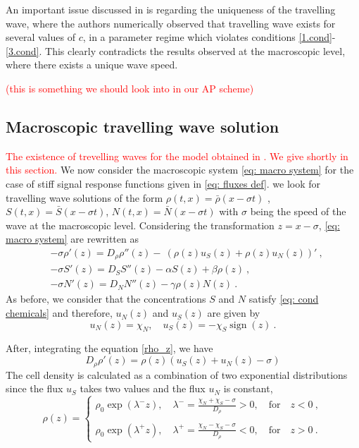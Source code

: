 \documentclass[11pt,twoside]{article}
\DeclareMathOperator{\sign}{sign}
\begin{document}
\noindent An important issue discussed in \cite{calvez2018well} is regarding the uniqueness of the travelling wave, where the authors numerically observed that travelling wave exists for several values of $c$, in a parameter regime which violates conditions \eqref{1.cond}-\eqref{3.cond}. This clearly contradicts the results observed at the macroscopic level, where there exists a unique wave speed.  

\textcolor{red}{(this is something we should look into in our AP scheme)}


\subsection{Macroscopic travelling wave solution}
\textcolor{red}{The existence of trevelling waves for the model obtained in \cite{saragosti2010mathematical}. We give shortly in this section.} We now consider the macroscopic system \eqref{eq: macro system} for the case of stiff signal response functions given in \eqref{eq: fluxes def}. we look for travelling wave solutions of the form
$\rho(t,x)=\bar{\rho}(x-\sigma t)$ , $S(t,x)=\bar{S}(x-\sigma t)$, $N(t,x)=\bar{N}(x-\sigma t)$ with $\sigma$  being the speed of the wave at the macroscopic level. Considering the transformation $z=x-\sigma$,  \eqref{eq: macro system} are rewritten as
\begin{align}
&-\sigma \rho'(z) =D_\rho \rho''(z)-\ (\rho(z) u_S(z)+\rho(z) u_N(z))'\ \label{rho_z},\\
&-\sigma S'(z) =D_S S''(z)-\alpha S(z)+\beta \rho(z)\ ,\\
&-\sigma  N'(z)=D_N N''(z)-\gamma \rho(z) N(z)\ .
\end{align}
As before, we consider that the concentrations $S$ and $N$ satisfy \eqref{eq: cond chemicals} and therefore, $u_N(z)$ and $u_S(z)$ are given by
$$ 
u_N(z)=\chi_N ,\quad u_S(z)=-\chi_S \sign(z)\ .
$$

After, integrating the equation \eqref{rho_z}, we have 
\begin{displaymath}
    D_\rho \rho'(z)=\rho(z)(u_S(z)+u_N(z)-\sigma)
\end{displaymath}
The cell density is calculated as a combination of two exponential distributions since the flux $u_S$ takes two values and the flux $u_N$ is constant, 
\begin{equation}\label{lamda}
    \rho(z)= \begin{cases} 
\rho_0\exp(\lambda^{-}z),\quad\lambda^{-}=
\frac{\chi_N+\chi_S-\sigma}{D_{\rho}}>0,\quad \textrm{for}\quad z<0 \ ,\\
\\

    \rho_0\exp(\lambda^{+}z), \quad \lambda^{+}=\frac{\chi_N-\chi_S-\sigma}{D_{\rho}}<0,\quad \textrm{for}\quad z>0\ .     
\end{cases}
\end{equation}
\end{document}
